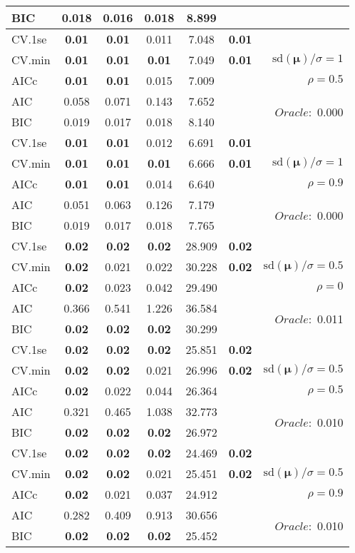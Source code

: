 \begin{table}
\begin{center}
\begin{tabular}{l*{5}{c}|r}
BIC & 0.018 & 0.016 & 0.018 & 8.899 & &  \\
 \hline 
CV.1se & {\bf 0.01} & {\bf 0.01} & 0.011 & 7.048 & {\bf 0.01} & \\
CV.min & {\bf 0.01} & {\bf 0.01} & {\bf 0.01} & 7.049 & {\bf 0.01} &  $\mathrm{sd}(\mathbf{\mu})/\sigma=1$ \\
AICc & {\bf 0.01} & {\bf 0.01} & 0.015 & 7.009 & & $\rho=0.5$ \\
AIC & 0.058 & 0.071 & 0.143 & 7.652 & &  \multirow{2}{*}{$Oracle: $ 0.000} \\
BIC & 0.019 & 0.017 & 0.018 & 8.140 & &  \\
 \hline 
CV.1se & {\bf 0.01} & {\bf 0.01} & 0.012 & 6.691 & {\bf 0.01} & \\
CV.min & {\bf 0.01} & {\bf 0.01} & {\bf 0.01} & 6.666 & {\bf 0.01} &  $\mathrm{sd}(\mathbf{\mu})/\sigma=1$ \\
AICc & {\bf 0.01} & {\bf 0.01} & 0.014 & 6.640 & & $\rho=0.9$ \\
AIC & 0.051 & 0.063 & 0.126 & 7.179 & &  \multirow{2}{*}{$Oracle: $ 0.000} \\
BIC & 0.019 & 0.017 & 0.018 & 7.765 & &  \\
 \hline 
CV.1se & {\bf 0.02} & {\bf 0.02} & {\bf 0.02} & 28.909 & {\bf 0.02} & \\
CV.min & {\bf 0.02} & 0.021 & 0.022 & 30.228 & {\bf 0.02} &  $\mathrm{sd}(\mathbf{\mu})/\sigma=0.5$ \\
AICc & {\bf 0.02} & 0.023 & 0.042 & 29.490 & & $\rho=0$ \\
AIC & 0.366 & 0.541 & 1.226 & 36.584 & &  \multirow{2}{*}{$Oracle: $ 0.011} \\
BIC & {\bf 0.02} & {\bf 0.02} & {\bf 0.02} & 30.299 & &  \\
 \hline 
CV.1se & {\bf 0.02} & {\bf 0.02} & {\bf 0.02} & 25.851 & {\bf 0.02} & \\
CV.min & {\bf 0.02} & {\bf 0.02} & 0.021 & 26.996 & {\bf 0.02} &  $\mathrm{sd}(\mathbf{\mu})/\sigma=0.5$ \\
AICc & {\bf 0.02} & 0.022 & 0.044 & 26.364 & & $\rho=0.5$ \\
AIC & 0.321 & 0.465 & 1.038 & 32.773 & &  \multirow{2}{*}{$Oracle: $ 0.010} \\
BIC & {\bf 0.02} & {\bf 0.02} & {\bf 0.02} & 26.972 & &  \\
 \hline 
CV.1se & {\bf 0.02} & {\bf 0.02} & {\bf 0.02} & 24.469 & {\bf 0.02} & \\
CV.min & {\bf 0.02} & {\bf 0.02} & 0.021 & 25.451 & {\bf 0.02} &  $\mathrm{sd}(\mathbf{\mu})/\sigma=0.5$ \\
AICc & {\bf 0.02} & 0.021 & 0.037 & 24.912 & & $\rho=0.9$ \\
AIC & 0.282 & 0.409 & 0.913 & 30.656 & &  \multirow{2}{*}{$Oracle: $ 0.010} \\
BIC & {\bf 0.02} & {\bf 0.02} & {\bf 0.02} & 25.452 & &  \\
 \hline 
\end{tabular}
\end{center}
\vspace{-1cm}
\end{table}




